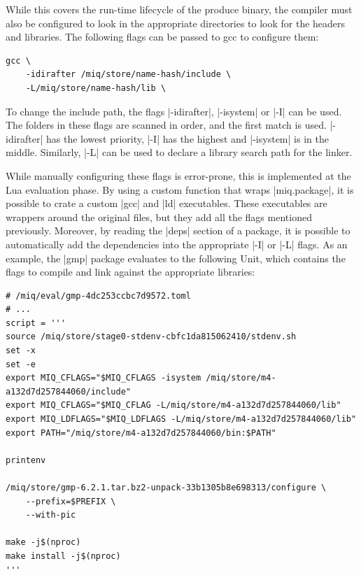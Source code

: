 While this covers the run-time lifecycle of the produce
binary, the compiler must also be configured to look in the
appropriate directories to look for the headers and
libraries. The following flags can be passed to gcc to
configure them:

\begin{verbatim}
gcc \
    -idirafter /miq/store/name-hash/include \
    -L/miq/store/name-hash/lib \
\end{verbatim}

To change the include path, the flags |-idirafter|,
|-isystem| or |-I| can be used. The folders in these flags
are scanned in order, and the first match is used.
|-idirafter| has the lowest priority, |-I| has the highest
and |-isystem| is in the middle.
Similarly, |-L| can be used to declare a library search path
for the linker.

While manually configuring these flags is error-prone, this
is implemented at the Lua evaluation phase. By using a
custom function that wraps |miq.package|, it is possible to
crate a custom |gcc| and |ld| executables. These executables
are wrappers around the original files, but they add all the
flags mentioned previously. Moreover, by reading the |deps|
section of a package, it is possible to automatically add
the dependencies into the appropriate |-I| or |-L| flags. As
an example, the |gmp| package evaluates to the following
Unit, which contains the flags to compile and link against
the appropriate libraries:

\begin{verbatim}
# /miq/eval/gmp-4dc253ccbc7d9572.toml
# ...
script = '''
source /miq/store/stage0-stdenv-cbfc1da815062410/stdenv.sh
set -x
set -e
export MIQ_CFLAGS="$MIQ_CFLAGS -isystem /miq/store/m4-a132d7d257844060/include"
export MIQ_CFLAGS="$MIQ_CFLAG -L/miq/store/m4-a132d7d257844060/lib"
export MIQ_LDFLAGS="$MIQ_LDFLAGS -L/miq/store/m4-a132d7d257844060/lib"
export PATH="/miq/store/m4-a132d7d257844060/bin:$PATH"

printenv

/miq/store/gmp-6.2.1.tar.bz2-unpack-33b1305b8e698313/configure \
    --prefix=$PREFIX \
    --with-pic

make -j$(nproc)
make install -j$(nproc)
'''

\end{verbatim}
